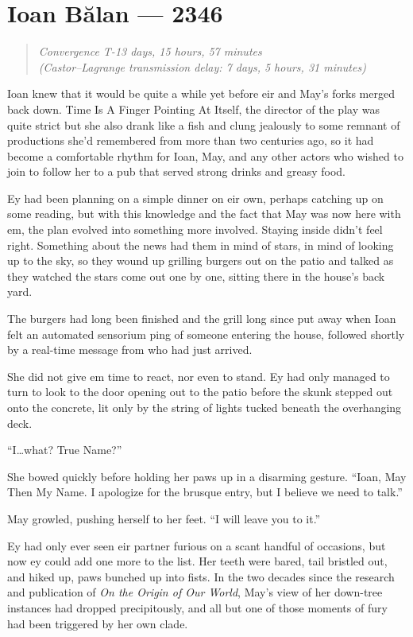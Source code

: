\hypertarget{ioan-bux103lan-2346}{%
\chapter{Ioan Bălan — 2346}\label{ioan-bux103lan-2346}}

\begin{quote}
\emph{Convergence T-13 days, 15 hours, 57 minutes}\\
\emph{(Castor--Lagrange transmission delay: 7 days, 5 hours, 31 minutes)}
\end{quote}

Ioan knew that it would be quite a while yet before eir and May's forks merged back down. Time Is A Finger Pointing At Itself, the director of the play was quite strict but she also drank like a fish and clung jealously to some remnant of productions she'd remembered from more than two centuries ago, so it had become a comfortable rhythm for Ioan, May, and any other actors who wished to join to follow her to a pub that served strong drinks and greasy food.

Ey had been planning on a simple dinner on eir own, perhaps catching up on some reading, but with this knowledge and the fact that May was now here with em, the plan evolved into something more involved. Staying inside didn't feel right. Something about the news had them in mind of stars, in mind of looking up to the sky, so they wound up grilling burgers out on the patio and talked as they watched the stars come out one by one, sitting there in the house's back yard.

The burgers had long been finished and the grill long since put away when Ioan felt an automated sensorium ping of someone entering the house, followed shortly by a real-time message from who had just arrived.

She did not give em time to react, nor even to stand. Ey had only managed to turn to look to the door opening out to the patio before the skunk stepped out onto the concrete, lit only by the string of lights tucked beneath the overhanging deck.

``I\ldots what? True Name?''

She bowed quickly before holding her paws up in a disarming gesture. ``Ioan, May Then My Name. I apologize for the brusque entry, but I believe we need to talk.''

May growled, pushing herself to her feet. ``I will leave you to it.''

Ey had only ever seen eir partner furious on a scant handful of occasions, but now ey could add one more to the list. Her teeth were bared, tail bristled out, and hiked up, paws bunched up into fists. In the two decades since the research and publication of \emph{On the Origin of Our World}, May's view of her down-tree instances had dropped precipitously, and all but one of those moments of fury had been triggered by her own clade.

